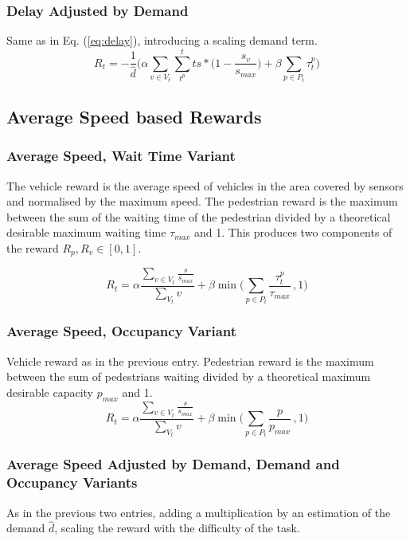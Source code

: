 \documentclass[conference]{IEEEtran}
\begin{document}
\subsubsection{Delay Adjusted by Demand}
Same as in Eq. (\ref{eq:delay}), introducing a scaling demand term.
\begin{equation}
    R_t = -\frac{1}{\hat{d}} \bigg( \alpha \sum_{v\in V_t}  \sum_{t^p}^t ts * \big( 1-\frac{s_v}{s_{max}} \big) + \beta \sum_{p \in P_t} \tau^p_{t} \bigg)
\label{eq:delay}
\end{equation}

\subsection{Average Speed based Rewards}
\subsubsection{Average Speed, Wait Time Variant}
The vehicle reward is the average speed of vehicles in the area covered by sensors and normalised by the maximum speed.
The pedestrian reward is the maximum between the sum of the waiting time of the pedestrian divided by a theoretical desirable maximum waiting time $\tau_{max}$ and 1.
This produces two components of the reward $R_p, R_v \in [0,1]$.

\begin{equation}
    R_t = \alpha \frac{\sum_{v \in V_t} \frac{s}{s_{max}}}{\sum_{V_t} v}  + \beta \min \big( \sum_{p \in P_t} \frac{\tau^p_{t}}{\tau_{max}} \, , 1 \big)
\label{eq:avgspeed_wait}
\end{equation}

\subsubsection{Average Speed, Occupancy Variant}
Vehicle reward as in the previous entry.
Pedestrian reward is the maximum between the sum of pedestrians waiting divided by a theoretical maximum desirable capacity $p_{max}$ and 1. 
\begin{equation}
    R_t =   \alpha \frac{ \sum_{v \in V_t} \frac{s}{s_{max}}}{\sum_{V_t} v} + \beta \min \big( \sum_{p \in P_t} \frac{p}{p_{max}} \, , 1 \big)
\label{eq:avgspeed_occ}
\end{equation}

\subsubsection{Average Speed Adjusted by Demand, Demand and Occupancy Variants}
As in the previous two entries, adding a multiplication by an estimation of the demand $\hat{d}$, scaling the reward with the difficulty of the task.
\end{document}
